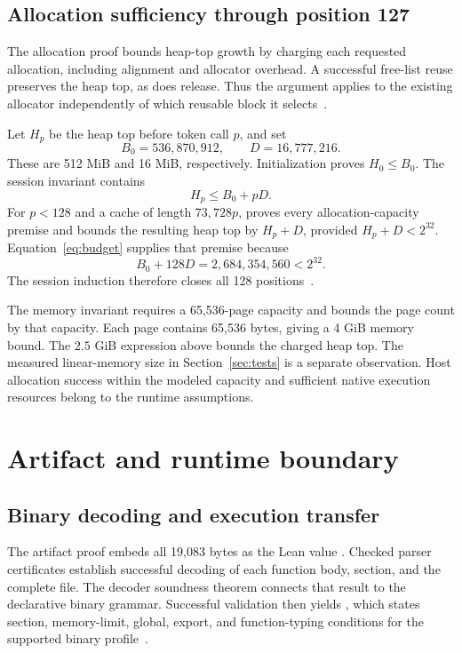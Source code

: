 \subsection{Allocation sufficiency through position 127}

The allocation proof bounds heap-top growth by charging each requested allocation, including alignment and allocator overhead.  A successful free-list reuse preserves the heap top, as does release.  Thus the argument applies to the existing allocator independently of which reusable block it selects~\cite{budget}.

Let $H_p$ be the heap top before token call $p$, and set
\[
B_0=536{,}870{,}912,\qquad D=16{,}777{,}216.
\]
These are 512 MiB and 16 MiB, respectively.  Initialization proves $H_0\leq B_0$.  The session invariant contains
\begin{equation}\label{eq:budget}
H_p\leq B_0+pD.
\end{equation}
For $p<128$ and a cache of length $73{,}728p$,  proves every allocation-capacity premise and bounds the resulting heap top by $H_p+D$, provided $H_p+D<2^{32}$.  Equation~\eqref{eq:budget} supplies that premise because
\[
B_0+128D=2{,}684{,}354{,}560<2^{32}.
\]
The session induction therefore closes all 128 positions~\cite{budget,session}.

The memory invariant requires a 65,536-page capacity and bounds the page count by that capacity.  Each page contains 65,536 bytes, giving a 4 GiB memory bound.  The $2.5$ GiB expression above bounds the charged heap top.  The measured linear-memory size in Section~\ref{sec:tests} is a separate observation.  Host allocation success within the modeled capacity and sufficient native execution resources belong to the runtime assumptions.

\section{Artifact and runtime boundary}\label{sec:boundary}

\subsection{Binary decoding and execution transfer}

The artifact proof embeds all 19,083 bytes as the Lean value .  Checked parser certificates establish successful decoding of each function body, section, and the complete file.  The decoder soundness theorem connects that result to the declarative binary grammar.  Successful validation then yields , which states section, memory-limit, global, export, and function-typing conditions for the supported binary profile~\cite{binary,artifact}.

